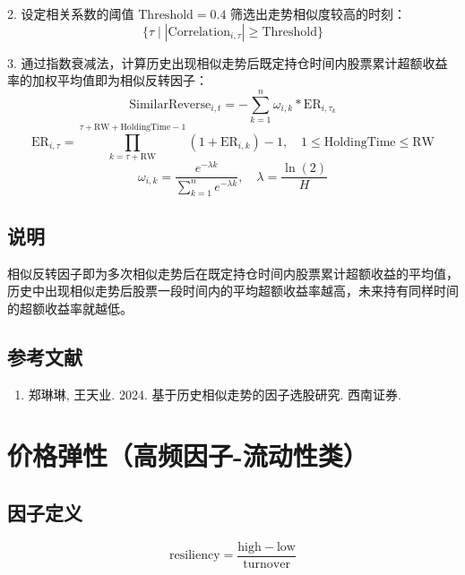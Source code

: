 \documentclass{article}
\begin{document}
2. 设定相关系数的阈值 \( \mathrm{Threshold}=0.4 \) 筛选出走势相似度较高的时刻：
\begin{equation}
    \{ \tau \mid |\mathrm{Correlation}_{i,\tau}| \geq \mathrm{Threshold} \}
\end{equation}

3. 通过指数衰减法，计算历史出现相似走势后既定持仓时间内股票累计超额收益率的加权平均值即为相似反转因子：
\begin{equation}
    \mathrm{SimilarReverse}_{i,t} = -\sum_{k=1}^n \omega_{i,k} * \mathrm{ER}_{i,\tau_k}
\end{equation}
\begin{equation}
    \mathrm{ER}_{i,\tau} = \prod_{k=\tau+\mathrm{RW}}^{\tau+\mathrm{RW}+\mathrm{HoldingTime}-1} (1 + \mathrm{ER}_{i,k}) - 1, \quad 1 \leq \mathrm{HoldingTime} \leq \mathrm{RW}
\end{equation}
\begin{equation}
    \omega_{i,k} = \frac{e^{-\lambda k}}{\sum_{k=1}^n e^{-\lambda k}}, \quad \lambda = \frac{\ln(2)}{H}
\end{equation}

\subsection{说明}
相似反转因子即为多次相似走势后在既定持仓时间内股票累计超额收益的平均值，历史中出现相似走势后股票一段时间内的平均超额收益率越高，未来持有同样时间的超额收益率就越低。

\subsection{参考文献}
\begin{enumerate}
    \item 郑琳琳, 王天业. 2024. 基于历史相似走势的因子选股研究. 西南证券.
\end{enumerate}

\section{价格弹性（高频因子-流动性类）}

\subsection{因子定义}
\begin{equation}
    \mathrm{resiliency} = \frac{\mathrm{high} - \mathrm{low}}{\mathrm{turnover}}
\end{equation}
\end{document}

